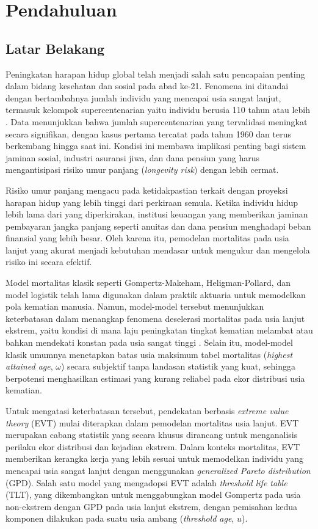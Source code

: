 \chapter{Pendahuluan}

\section{Latar Belakang}

Peningkatan harapan hidup global telah menjadi salah satu pencapaian penting dalam bidang kesehatan dan sosial pada abad ke-21. Fenomena ini ditandai dengan bertambahnya jumlah individu yang mencapai usia sangat lanjut, termasuk kelompok supercentenarian yaitu individu berusia 110 tahun atau lebih \citep{Young2021}. Data menunjukkan bahwa jumlah supercentenarian yang tervalidasi meningkat secara signifikan, dengan kasus pertama tercatat pada tahun 1960 dan terus berkembang hingga saat ini. Kondisi ini membawa implikasi penting bagi sistem jaminan sosial, industri asuransi jiwa, dan dana pensiun yang harus mengantisipasi risiko umur panjang (\textit{longevity risk}) dengan lebih cermat.

Risiko umur panjang mengacu pada ketidakpastian terkait dengan proyeksi harapan hidup yang lebih tinggi dari perkiraan semula. Ketika individu hidup lebih lama dari yang diperkirakan, institusi keuangan yang memberikan jaminan pembayaran jangka panjang seperti anuitas dan dana pensiun menghadapi beban finansial yang lebih besar. Oleh karena itu, pemodelan mortalitas pada usia lanjut yang akurat menjadi kebutuhan mendasar untuk mengukur dan mengelola risiko ini secara efektif.

Model mortalitas klasik seperti Gompertz-Makeham, Heligman-Pollard, dan model logistik telah lama digunakan dalam praktik aktuaria untuk memodelkan pola kematian manusia. Namun, model-model tersebut menunjukkan keterbatasan dalam menangkap fenomena deselerasi mortalitas pada usia lanjut ekstrem, yaitu kondisi di mana laju peningkatan tingkat kematian melambat atau bahkan mendekati konstan pada usia sangat tinggi \citep{Thatcher1999}. Selain itu, model-model klasik umumnya menetapkan batas usia maksimum tabel mortalitas (\textit{highest attained age}, $\omega$) secara subjektif tanpa landasan statistik yang kuat, sehingga berpotensi menghasilkan estimasi yang kurang reliabel pada ekor distribusi usia kematian.

Untuk mengatasi keterbatasan tersebut, pendekatan berbasis \textit{extreme value theory} (EVT) mulai diterapkan dalam pemodelan mortalitas usia lanjut. EVT merupakan cabang statistik yang secara khusus dirancang untuk menganalisis perilaku ekor distribusi dan kejadian ekstrem. Dalam konteks mortalitas, EVT memberikan kerangka kerja yang lebih sesuai untuk memodelkan individu yang mencapai usia sangat lanjut dengan menggunakan \textit{generalized Pareto distribution} (GPD). Salah satu model yang mengadopsi EVT adalah \textit{threshold life table} (TLT), yang dikembangkan untuk menggabungkan model Gompertz pada usia non-ekstrem dengan GPD pada usia lanjut ekstrem, dengan pemisahan kedua komponen dilakukan pada suatu usia ambang (\textit{threshold age}, $u$).

